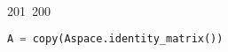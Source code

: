 201~200~\documentclass{article}
\begin{document}
\begin{lstlisting}[language=Python, caption=LLL Algorithm to crack private key chall 4]
	                                                                        	                                                                    	                                	                    	                    	                        	                        	                    	                                                                	                	                                                                    	                    							                                                                                                                                                                                                    		                                                                                                                        				    			                                                                                                                    A = copy(Aspace.identity_matrix())

	                                                                        	                                                                    	                                	                    	                    	                        	                        	                    	                                                                	                	                                                                    	                    							                                                                                                                                                                                                    		                                                                                                                        				    			                                                                                                                        A = A*n
	                                                                        	                                                                    	                                	                    	                    	                        	                        	                    	                                                                	                	                                                                    	                    							                                                                                                                                                                                                    		                                                                                                                        				    			                                                                                                                            B = pow(2,256)


\end{lstlisting}
\end{document}
